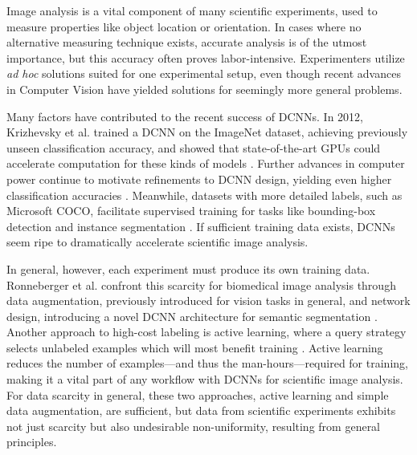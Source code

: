 \documentclass[10pt, draftcls]{IEEEtran}
\begin{document}

Image analysis is a vital component of many scientific experiments, used to
measure properties like object location or orientation. In cases where no
alternative measuring technique exists, accurate analysis is of the utmost
importance, but this accuracy often proves labor-intensive. Experimenters
utilize \emph{ad hoc} solutions suited for one experimental setup, even though
recent advances in Computer Vision have yielded solutions for seemingly more
general problems.

Many factors have contributed to the recent success of DCNNs. In 2012,
Krizhevsky et al. trained a DCNN on the ImageNet dataset, achieving previously
unseen classification accuracy, and showed that state-of-the-art GPUs could
accelerate computation for these kinds of models \cite{krizhevsky_imagenet_2012,
  deng_imagenet:_nodate}. Further advances in computer power continue to
motivate refinements to DCNN design, yielding even higher classification
accuracies \cite{simonyan_very_2014, szegedy_going_2014,
  he_deep_2015}. Meanwhile, datasets with more detailed labels, such as
Microsoft COCO, facilitate supervised training for tasks like bounding-box
detection and instance segmentation \cite{lin_microsoft_2014}. If sufficient
training data exists, DCNNs seem ripe to dramatically accelerate scientific
image analysis.

In general, however, each experiment must produce its own training
data. Ronneberger et al. confront this scarcity for biomedical image analysis
through data augmentation, previously introduced for vision tasks in general,
and network design, introducing a novel DCNN architecture for semantic
segmentation \cite{krizhevsky_imagenet_2012, ronneberger_u-net:_2015}. Another
approach to high-cost labeling is active learning, where a query strategy
selects unlabeled examples which will most benefit training
\cite{settles_active_2012}. Active learning reduces the number of examples---and
thus the man-hours---required for training, making it a vital part of any
workflow with DCNNs for scientific image analysis. For data scarcity in general,
these two approaches, active learning and simple data augmentation, are
sufficient, but data from scientific experiments exhibits not just scarcity but
also undesirable non-uniformity, resulting from general principles.
\end{document}
